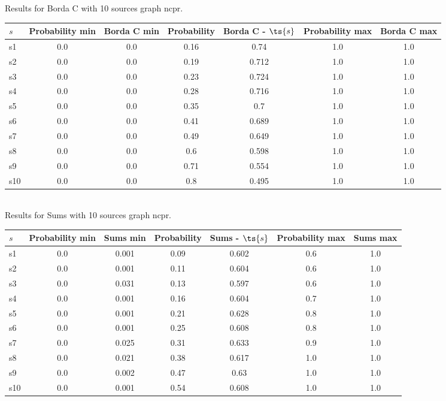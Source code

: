 \documentclass{article}
\begin{document}
\noindent Results for Borda C with 10 sources graph ncpr.

\noindent\begin{tabular}{|l|c|c|c|c|c|c|}
\hline
$s$& Probability min & Borda C min & Probability & Borda C - $\ts{s}$ & Probability max & Borda C max\\
\hline
s1 &0.0 & 0.0 & 0.16 & 0.74 & 1.0 & 1.0\\
\hline
s2 &0.0 & 0.0 & 0.19 & 0.712 & 1.0 & 1.0\\
\hline
s3 &0.0 & 0.0 & 0.23 & 0.724 & 1.0 & 1.0\\
\hline
s4 &0.0 & 0.0 & 0.28 & 0.716 & 1.0 & 1.0\\
\hline
s5 &0.0 & 0.0 & 0.35 & 0.7 & 1.0 & 1.0\\
\hline
s6 &0.0 & 0.0 & 0.41 & 0.689 & 1.0 & 1.0\\
\hline
s7 &0.0 & 0.0 & 0.49 & 0.649 & 1.0 & 1.0\\
\hline
s8 &0.0 & 0.0 & 0.6 & 0.598 & 1.0 & 1.0\\
\hline
s9 &0.0 & 0.0 & 0.71 & 0.554 & 1.0 & 1.0\\
\hline
s10 &0.0 & 0.0 & 0.8 & 0.495 & 1.0 & 1.0\\
\hline
\end{tabular}\\

\noindent Results for Sums with 10 sources graph ncpr.

\noindent\begin{tabular}{|l|c|c|c|c|c|c|}
\hline
$s$& Probability min & Sums min & Probability & Sums - $\ts{s}$ & Probability max & Sums max\\
\hline
s1 &0.0 & 0.001 & 0.09 & 0.602 & 0.6 & 1.0\\
\hline
s2 &0.0 & 0.001 & 0.11 & 0.604 & 0.6 & 1.0\\
\hline
s3 &0.0 & 0.031 & 0.13 & 0.597 & 0.6 & 1.0\\
\hline
s4 &0.0 & 0.001 & 0.16 & 0.604 & 0.7 & 1.0\\
\hline
s5 &0.0 & 0.001 & 0.21 & 0.628 & 0.8 & 1.0\\
\hline
s6 &0.0 & 0.001 & 0.25 & 0.608 & 0.8 & 1.0\\
\hline
s7 &0.0 & 0.025 & 0.31 & 0.633 & 0.9 & 1.0\\
\hline
s8 &0.0 & 0.021 & 0.38 & 0.617 & 1.0 & 1.0\\
\hline
s9 &0.0 & 0.002 & 0.47 & 0.63 & 1.0 & 1.0\\
\hline
s10 &0.0 & 0.001 & 0.54 & 0.608 & 1.0 & 1.0\\
\hline
\end{tabular}\\
\end{document}
